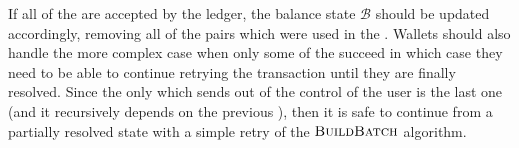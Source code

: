 If all of the  are accepted by the ledger, the balance state $\mathcal{B}$ should be updated accordingly, removing all of the pairs which were used in the \Transfer{}. Wallets should also handle the more complex case when only some of the  succeed in which case they need to be able to continue retrying the transaction until they are finally resolved. Since the only \Transfer{} which sends  out of the control of the user is the last one (and it recursively depends on the previous ), then it is safe to continue from a partially resolved state with a simple retry of the $\textsc{BuildBatch}$ algorithm.

